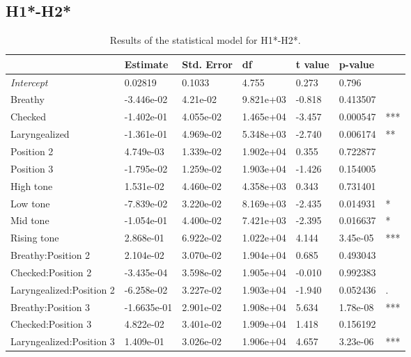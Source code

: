 \documentclass[12pt, letterpaper]{article}
\providecommand{\lsptoprule}{\midrule\toprule}
\providecommand{\lspbottomrule}{\bottomrule\midrule}
\begin{document}
\subsection{H1*-H2*} \label{sec:H1H2}

\begin{table}[!h]
  \centering
  \caption{Results of the statistical model for H1*-H2*.}
  \label{tab:H1H2Results}
  \begin{tabular}{lllllll}
    \lsptoprule
     & Estimate & Std. Error & df & t value & p-value & \\ \hline
    \textit{Intercept} & 0.02819 & 0.1033 & 4.755 & 0.273 & 0.796 & \\
    Breathy & -3.446e-02 & 4.21e-02&9.821e+03&-0.818& 0.413507 & \\
    Checked & -1.402e-01 & 4.055e-02 & 1.465e+04 & -3.457 & 0.000547 & *** \\
    Laryngealized & -1.361e-01 &4.969e-02 & 5.348e+03 & -2.740 & 0.006174 & ** \\
    Position 2 & 4.749e-03 & 1.339e-02 & 1.902e+04 & 0.355 & 0.722877 & \\
    Position 3 &-1.795e-02&1.259e-02&1.903e+04&-1.426& 0.154005 & \\
    High tone &1.531e-02&4.460e-02&4.358e+03&0.343& 0.731401 & \\
    Low tone &-7.839e-02&3.220e-02&8.169e+03&-2.435& 0.014931 & * \\
    Mid tone &-1.054e-01&4.400e-02&7.421e+03&-2.395& 0.016637 & *  \\
    Rising tone &2.868e-01&6.922e-02&1.022e+04&4.144&3.45e-05 & *** \\
    Breathy:Position 2 &2.104e-02&3.070e-02&1.904e+04&0.685& 0.493043 & \\
    Checked:Position 2 &-3.435e-04&3.598e-02&1.905e+04&-0.010& 0.992383 & \\
    Laryngealized:Position 2 &-6.258e-02&3.227e-02&1.903e+04&-1.940&0.052436 & .  \\
    Breathy:Position 3 &-1.6635e-01&2.901e-02&1.908e+04&5.634& 1.78e-08 & *** \\
    Checked:Position 3 &4.822e-02&3.401e-02&1.909e+04&1.418&0.156192 & \\
    Laryngealized:Position 3 &1.409e-01&3.026e-02&1.906e+04&4.657&3.23e-06 & *** \\
    \lspbottomrule
  \end{tabular}
\end{table}
\end{document}
